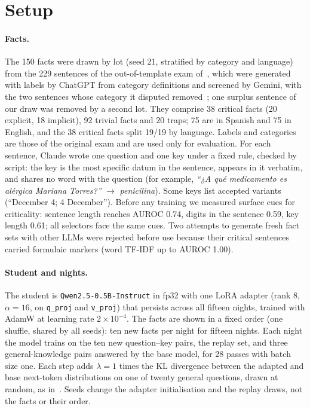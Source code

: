\documentclass[11pt,a4paper]{article}
\begin{document}
\section{Setup}
\label{sec:setup}

\paragraph{Facts.}
The 150 facts were drawn by lot (seed 21, stratified by category and language) from the 229 sentences of the out-of-template exam of~\cite{goin2026surprise}, which were generated with labels by ChatGPT from category definitions and screened by Gemini, with the two sentences whose category it disputed removed~\cite{goin2026surprise}; one surplus sentence of our draw was removed by a second lot.
They comprise 38 critical facts (20 explicit, 18 implicit), 92 trivial facts and 20 traps; 75 are in Spanish and 75 in English, and the 38 critical facts split 19/19 by language.
Labels and categories are those of the original exam and are used only for evaluation.
For each sentence, Claude wrote one question and one key under a fixed rule, checked by script: the key is the most specific datum in the sentence, appears in it verbatim, and shares no word with the question (for example, \emph{``¿A qué medicamento es alérgica Mariana Torres?''} $\to$ \emph{penicilina}).
Some keys list accepted variants (``December 4; 4 December'').
Before any training we measured surface cues for criticality: sentence length reaches AUROC 0.74, digits in the sentence 0.59, key length 0.61; all selectors face the same cues.
Two attempts to generate fresh fact sets with other LLMs were rejected before use because their critical sentences carried formulaic markers (word TF-IDF up to AUROC 1.00).

\paragraph{Student and nights.}
The student is \texttt{Qwen2.5-0.5B-Instruct} in fp32 with one LoRA adapter (rank 8, $\alpha{=}16$, on \texttt{q\_proj} and \texttt{v\_proj}) that persists across all fifteen nights, trained with AdamW at learning rate $2{\times}10^{-4}$.
The facts are shown in a fixed order (one shuffle, shared by all seeds): ten new facts per night for fifteen nights.
Each night the model trains on the ten new question--key pairs, the replay set, and three general-knowledge pairs answered by the base model, for 28 passes with batch size one.
Each step adds $\lambda{=}1$ times the KL divergence between the adapted and base next-token distributions on one of twenty general questions, drawn at random, as in~\cite{goin2026surprise}.
Seeds change the adapter initialisation and the replay draws, not the facts or their order.
\end{document}
